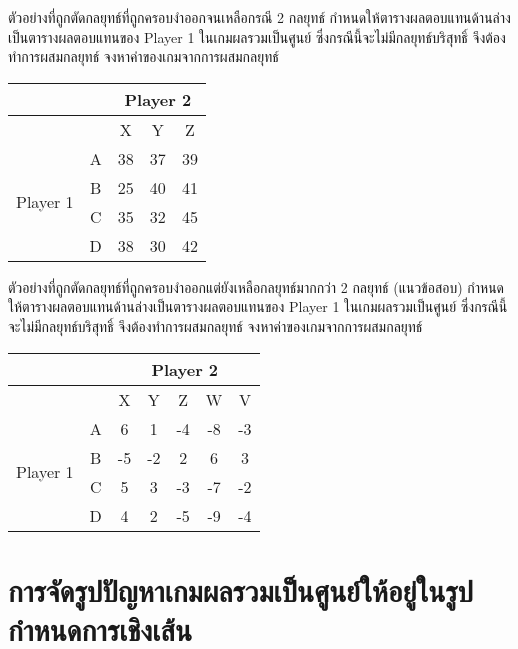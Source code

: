 \begin{example}
	{ตัวอย่างที่ถูกตัดกลยุทธ์ที่ถูกครอบงำออกจนเหลือกรณี 2 กลยุทธ์}{}
	กำหนดให้ตารางผลตอบแทนด้านล่างเป็นตารางผลตอบแทนของ Player 1 ในเกมผลรวมเป็นศูนย์ ซึ่งกรณีนี้จะไม่มีกลยุทธ์บริสุทธิ์ จึงต้องทำการผสมกลยุทธ์ จงหาค่าของเกมจากการผสมกลยุทธ์\\
	\begin{tabular}{|c|c|ccc|}
		\hline
		&   & \multicolumn{3}{c|}{Player 2}                         \\ \hline
		&   & \multicolumn{1}{c|}{X}  & \multicolumn{1}{c|}{Y} & Z  \\ \hline
		\multirow{4}{*}{Player 1} & A & \multicolumn{1}{c|}{38}  & \multicolumn{1}{c|}{37} & 39 \\ \cline{2-5} 
		& B & \multicolumn{1}{c|}{25} & \multicolumn{1}{c|}{40} & 41  \\ \cline{2-5} 
		& C & \multicolumn{1}{c|}{35}  & \multicolumn{1}{c|}{32} & 45  \\ \cline{2-5} 
		& D & \multicolumn{1}{c|}{38} & \multicolumn{1}{c|}{30} & 42  \\ \hline
	\end{tabular}
\end{example}
\newpage


\begin{example}
	{ตัวอย่างที่ถูกตัดกลยุทธ์ที่ถูกครอบงำออกแต่ยังเหลือกลยุทธ์มากกว่า 2 กลยุทธ์ (แนวข้อสอบ)}{}
	กำหนดให้ตารางผลตอบแทนด้านล่างเป็นตารางผลตอบแทนของ Player 1 ในเกมผลรวมเป็นศูนย์ ซึ่งกรณีนี้จะไม่มีกลยุทธ์บริสุทธิ์ จึงต้องทำการผสมกลยุทธ์ จงหาค่าของเกมจากการผสมกลยุทธ์\\
	\begin{tabular}{|c|c|ccccc|}
		\hline
		&   & \multicolumn{5}{c|}{Player 2}                         \\ \hline
		&   & \multicolumn{1}{c|}{X}  & \multicolumn{1}{c|}{Y} & \multicolumn{1}{c|}{Z} & \multicolumn{1}{c|}{W} & V \\ \hline
		\multirow{4}{*}{Player 1} 
		& A & \multicolumn{1}{c|}{6}  & \multicolumn{1}{c|}{1} & \multicolumn{1}{c|}{-4} & \multicolumn{1}{c|}{-8} & -3 \\ \cline{2-7} 
		& B & \multicolumn{1}{c|}{-5} & \multicolumn{1}{c|}{-2} & \multicolumn{1}{c|}{2}  & \multicolumn{1}{c|}{6}  & 3  \\ \cline{2-7} 
		& C & \multicolumn{1}{c|}{5}  & \multicolumn{1}{c|}{3} & \multicolumn{1}{c|}{-3} & \multicolumn{1}{c|}{-7} & -2 \\ \cline{2-7} 
		& D & \multicolumn{1}{c|}{4}  & \multicolumn{1}{c|}{2} & \multicolumn{1}{c|}{-5} & \multicolumn{1}{c|}{-9} & -4 \\ \hline
	\end{tabular}
\end{example}
\newpage



\section{การจัดรูปปัญหาเกมผลรวมเป็นศูนย์ให้อยู่ในรูปกำหนดการเชิงเส้น}